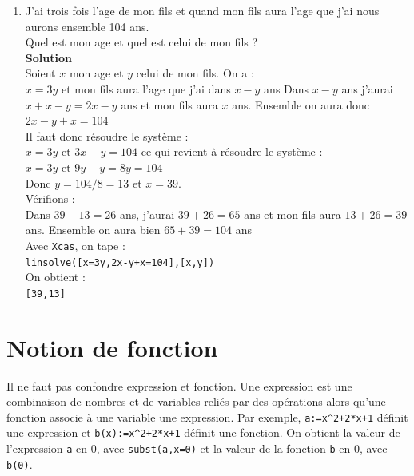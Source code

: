 \documentclass[a4paper,11pt]{book}
\begin{document}
\begin{enumerate}
{\bf Solution}\\
Soient $x$ et $y$ les 2 facteurs on a :\\
$x=3y$ et $(x+4)(y+4)=xy+224$\\
Puisque $(x+4)(y+4)=xy+4(x+y+4)$, il faut r\'esoudre le syst\`eme :\\
$x=3y$ et $x+y=224/4-4=56-4=52$ ce qui revient \`a r\'esoudre le syst\`eme :\\
$x=3y$ et $3y+y=52$\\
Donc $y=13$ et $x=39$
V\'erifions :\\
$xy=13*39=507$ et $17*43=731$ et on a bien $731-507=224$\\
Avec {\tt Xcas}, on tape :\\
{\tt linsolve([x=3y,(x+4)*(y+4)=x*y+224],[x,y])}\\
On obtient :\\
{\tt [39,13]}
\item J'ai trois fois l'age de mon fils et quand mon fils aura l'age que j'ai
nous aurons ensemble 104 ans.\\
Quel est mon age et quel est celui de mon fils ?\\
{\bf Solution}\\
Soient $x$ mon age et $y$ celui de mon fils. On a :\\
$x=3y$ et mon fils aura l'age que j'ai dans $x-y$ ans
Dans $x-y$ ans j'aurai $x+x-y=2x-y$ ans et mon fils aura $x$ ans.
Ensemble on aura donc $2x-y+x=104$\\
Il faut donc r\'esoudre le syst\`eme :\\
$x=3y$ et $3x-y=104$ ce qui revient \`a r\'esoudre le syst\`eme :\\
$x=3y$ et $9y-y=8y=104$\\
Donc $y=104/8=13$ et $x=39$.\\
V\'erifions :\\
Dans $39-13=26$ ans, j'aurai $39+26=65$ ans et mon fils aura $13+26=39$ ans.
Ensemble on aura bien $65+39=104$ ans\\  
Avec {\tt Xcas}, on tape :\\
{\tt linsolve([x=3y,2x-y+x=104],[x,y])}\\
On obtient :\\
{\tt [39,13]}
\end{enumerate}
\chapter{Notion de fonction}\index{:=}
Il ne faut pas confondre expression et fonction.
Une expression est une combinaison de nombres et de variables
reli\'es par des op\'erations alors qu'une 
fonction associe \`a une variable une expression. Par exemple,
\verb|a:=x^2+2*x+1| définit une expression et
\verb|b(x):=x^2+2*x+1| définit une fonction. 
On obtient la valeur de l'expression \verb|a| en 0, avec
\verb|subst(a,x=0)| et  la valeur de la fonction \verb|b| en 0, 
avec \verb|b(0)|.
\end{document}
